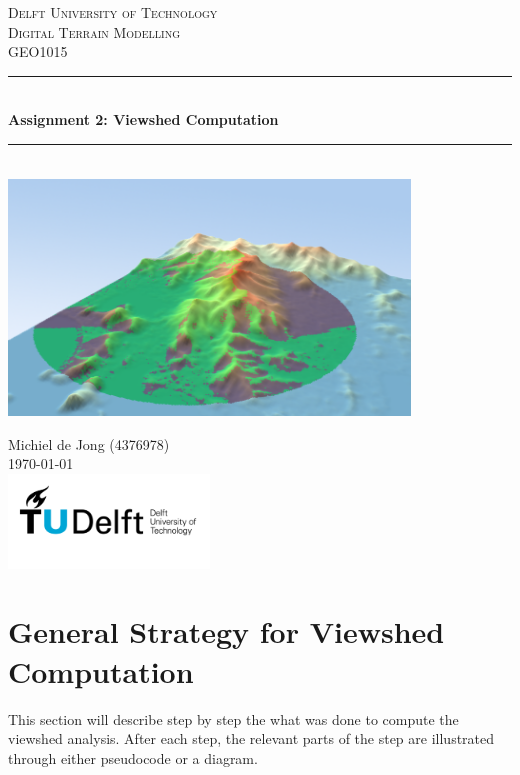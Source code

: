 \documentclass[a4paper]{article}
\begin{document}
\begin{titlepage}

\newcommand{\HRule}{\rule{\linewidth}{0.5mm}} 							%
\center 
 
\textsc{\LARGE Delft University of Technology}\\[1cm]

\textsc{\Large Digital Terrain Modelling}\\[0.2cm]
\textsc{\large GEO1015}\\[1cm] 										%
\HRule \\[0.8cm]
{ \huge \bfseries Assignment 2: Viewshed Computation}\\[0.7cm]								%
\HRule \\[1cm]
\includegraphics[width=0.8\textwidth]{images/cristo_3d copy.png}\\[1cm]
\large

Michiel de Jong (4376978)\\[1.5cm]													%
{\large \today}\\[2cm]
\includegraphics[width=0.4\textwidth]{images/TU_delft_logo.jpg}\\[1cm] 	%
\vfill 
\end{titlepage}


\section*{General Strategy for Viewshed Computation}
This section will describe step by step the what was done to compute the viewshed analysis. After each step, the relevant parts of the step are illustrated through either pseudocode or a diagram. 
\end{document}
